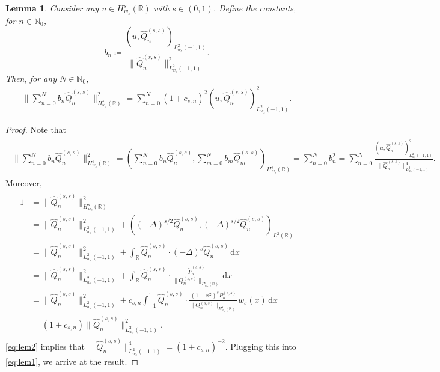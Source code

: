 \documentclass[10pt,a4paper]{article}
\newcommand{\dx}{\mathrm{d}x}
\newtheorem{lemma}{Lemma}[section]
\numberwithin{equation}{section}
\begin{document}
\begin{lemma}
\label{lem:b}
Consider any $u \in H^s_{w_s}(\mathbb{R})$ with $s \in (0,1)$. Define the constants, for $n \in \mathbb{N}_0$, 
\[
b_n \coloneqq \frac{(u, \hat{Q}_n^{(s,s)})_{L^2_{w_s}(-1,1)}}{\|\hat{Q}_n^{(s,s)}\|^2_{L^2_{w_s}(-1,1)}}.
\]
Then, for any $N \in \mathbb{N}_0$,
\begin{align}
\| \sum_{n=0}^N b_n \hat{Q}_n^{(s,s)}\|^2_{H^s_{w_s}(\mathbb{R})} = \sum_{n=0}^N (1+c_{s,n})^2 (u, \hat{Q}_n^{(s,s)})^2_{L^2_{w_s}(-1,1)}.
\end{align}
\end{lemma}
\begin{proof}
Note that
\begin{align}
\begin{split}
\| \sum_{n=0}^N b_n \hat{Q}_n^{(s,s)}\|^2_{H^s_{w_s}(\mathbb{R})} 
 = (\sum_{n=0}^N b_n \hat{Q}_n^{(s,s)}, \sum_{m=0}^N b_m \hat{Q}_m^{(s,s)})_{H^s_{w_s}(\mathbb{R})} 
= \sum_{n=0}^N b_n^2 
= \sum_{n=0}^N \frac{(u, \hat{Q}_n^{(s,s)})^2_{L^2_{w_s}(-1,1)}}{\|\hat{Q}_n^{(s,s)}\|^4_{L^2_{w_s}(-1,1)}}.
\label{eq:lem1}
\end{split}
\end{align}
Moreover,
\begin{align}
\begin{split}
1 
&= \| \hat{Q}^{(s,s)}_n \|^2_{H^s_{w_s}(\mathbb{R})} \\
& = \|\hat{Q}^{(s,s)}_n\|^2_{L^2_{w_s}(-1,1)} + ((-\Delta)^{s/2} \hat{Q}_n^{(s,s)}, (-\Delta)^{s/2}\hat{Q}_n^{(s,s)})_{L^2(\mathbb{R})} \\
&=  \|\hat{Q}^{(s,s)}_n\|^2_{L^2_{w_s}(-1,1)} + \int_{\mathbb{R}} \hat{Q}_n^{(s,s)} \cdot (-\Delta)^{s} \hat{Q}_n^{(s,s)}\, \dx\\
&=  \|\hat{Q}^{(s,s)}_n\|^2_{L^2_{w_s}(-1,1)} + \int_{\mathbb{R}} \hat{Q}_n^{(s,s)} \cdot  \frac{{\tilde P}_n^{(s,s)}}{\|{Q}_n^{(s,s)}\|_{H^s_{w_s}(\mathbb{R})}}\, \dx\\
&=\|\hat{Q}^{(s,s)}_n\|^2_{L^2_{w_s}(-1,1)} + c_{s,n} \int_{-1}^1 \hat{Q}^{(s,s)}_n \cdot  \frac{(1-x^2)^s {P}_n^{(s,s)}}{\|{Q}_n^{(s,s)}\|_{H^s_{w_s}(\mathbb{R})}} w_s(x) \, \dx\\
&= (1+c_{s,n})  \|\hat{Q}^{(s,s)}_n\|^2_{L^2_{w_s}(-1,1)}.
\label{eq:lem2}
\end{split}
\end{align}
\cref{eq:lem2} implies that $ \|\hat{Q}^{(s,s)}_n\|^4_{L^2_{w_s}(-1,1)} = (1+c_{s,n})^{-2}$. Plugging this into \cref{eq:lem1}, we arrive at the result.
\end{proof}
\end{document}
